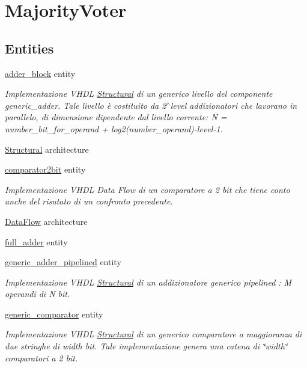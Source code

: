 \hypertarget{group___majority_voter}{\section{Majority\+Voter}
\label{group___majority_voter}
}
\subsection*{Entities}
\begin{DoxyCompactItemize}
\item 
\hyperlink{classadder__block}{adder\+\_\+block} entity
\begin{DoxyCompactList}\small\item\em Implementazione V\+H\+D\+L \hyperlink{classadder__block_1_1_structural}{Structural} di un generico livello del componente generic\+\_\+adder. Tale livello è costituito da 2$^\wedge$level addizionatori che lavorano in parallelo, di dimensione dipendente dal livello corrente\+: N = number\+\_\+bit\+\_\+for\+\_\+operand + log2(number\+\_\+operand)-\/level-\/1. \end{DoxyCompactList}\item 
\hyperlink{classadder__block_1_1_structural}{Structural} architecture
\item 
\hyperlink{classcomparator2bit}{comparator2bit} entity
\begin{DoxyCompactList}\small\item\em Implementazione V\+H\+D\+L Data Flow di un comparatore a 2 bit che tiene conto anche del risutato di un confronto precedente. \end{DoxyCompactList}\item 
\hyperlink{classcomparator2bit_1_1_data_flow}{Data\+Flow} architecture
\item 
\hyperlink{classfull__adder}{full\+\_\+adder} entity
\item 
\hyperlink{classgeneric__adder__pipelined}{generic\+\_\+adder\+\_\+pipelined} entity
\begin{DoxyCompactList}\small\item\em Implementazione V\+H\+D\+L \hyperlink{classgeneric__adder__pipelined_1_1_structural}{Structural} di un addizionatore generico pipelined \+: M operandi di N bit. \end{DoxyCompactList}\item 
\hyperlink{classgeneric__comparator}{generic\+\_\+comparator} entity
\begin{DoxyCompactList}\small\item\em Implementazione V\+H\+D\+L \hyperlink{classgeneric__comparator_1_1_structural}{Structural} di un generico comparatore a maggioranza di due stringhe di width bit. Tale implementazione genera una catena di \char`\"{}width\char`\"{} comparatori a 2 bit. \end{DoxyCompactList}\item 

\end{DoxyCompactItemize}
